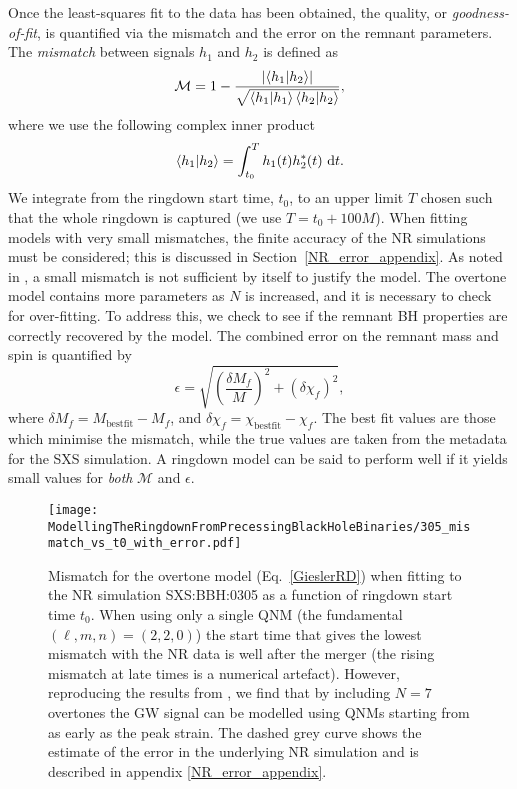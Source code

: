 Once the least-squares fit to the data has been obtained, the quality, or \emph{goodness-of-fit}, is quantified via the mismatch and the error on the remnant parameters.
The \emph{mismatch} between signals $h_1$ and $h_2$ is defined as
\begin{equation}\label{mismatch}
    \mathcal{M} = 1 - \frac{\abs{ \braket{h_1}{h_2} }}{\sqrt{\braket{h_1}\braket{h_2}}},
\end{equation}
where we use the following complex inner product~\cite{Nollert:1998ys}
\begin{equation} \label{eq:inner_prod}
    \braket{h_1}{h_2} = \int_{t_0}^T h_1(t) h^*_2(t) ~ \dd t.
\end{equation}
We integrate from the ringdown start time, $t_0$, to an upper limit $T$ chosen such that the whole ringdown is captured (we use $T = t_0 + 100M$).
When fitting models with very small mismatches, the finite accuracy of the NR simulations must be considered; this is discussed in Section~\ref{NR_error_appendix}.
As noted in \cite{Giesler:2019uxc}, a small mismatch is not sufficient by itself to justify the model.
The overtone model contains more parameters as $N$ is increased, and it is necessary to check for over-fitting.
To address this, we check to see if the remnant BH properties are correctly recovered by the model. 
The combined error on the remnant mass and spin is quantified by \cite{Giesler:2019uxc}
\begin{equation} \label{eq:epsilon}
    \epsilon = \sqrt{ \left( \frac{\delta M_f}{M} \right)^2 + \left( \delta\chi_f \right)^2 },
\end{equation}
where $\delta M_f = M_{\mathrm{best fit}} - M_f$, and $\delta \chi_f = \chi_{\mathrm{best fit}} - \chi_f$. 
The best fit values are those which minimise the mismatch, while the true values are taken from the metadata for the SXS simulation.
A ringdown model can be said to perform well if it yields small values for \emph{both} $\mathcal{M}$ and $\epsilon$.

\begin{figure}[t]
    \centering
    \texttt{[image: ModellingTheRingdownFromPrecessingBlackHoleBinaries/305\_mismatch\_vs\_t0\_with\_error.pdf]}
    \caption[Mismatch as a function of ringdown start time for an overtone model fitted to SXS:BBH:0305]{ 
    Mismatch for the overtone model (Eq.~\ref{GieslerRD}) when fitting to the NR simulation SXS:BBH:0305 as a function of ringdown start time $t_0$. When using only a single QNM (the fundamental $(\ell,m,n)=(2,2,0)$) the start time that gives the lowest mismatch with the NR data is well after the merger (the rising mismatch at late times is a numerical artefact). However, reproducing the results from \cite{Giesler:2019uxc}, we find that by including $N=7$ overtones the GW signal can be modelled using QNMs starting from as early as the peak strain. The dashed grey curve shows the estimate of the error in the underlying NR simulation and is described in appendix \ref{NR_error_appendix}.
    }
    \label{305_mismatch_vs_t0}
\end{figure}

